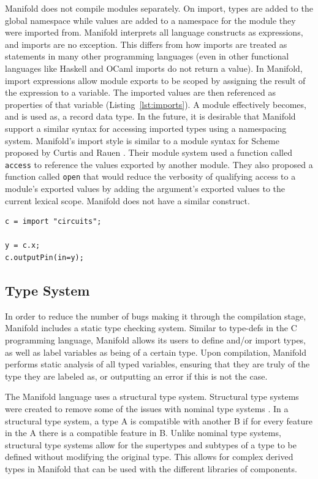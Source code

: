 Manifold does not compile modules separately. On import, types
are added to the global namespace while values are added to a namespace for the
module they were imported from. Manifold interprets all language constructs as
expressions, and imports are no exception. This differs from how imports are
treated as statements in many other
programming languages (even in other functional languages like Haskell and
OCaml imports do not return a value).  In Manifold, import expressions allow module
exports to be scoped by assigning the result of the expression
to a variable. The imported values are then referenced as properties of that
variable (Listing~\ref{lst:imports}). A module effectively becomes, and is used as,
a
record data type. In the future, it is desirable that Manifold support a
similar syntax for accessing imported types using a namespacing system.
Manifold's import style is similar to a module syntax for Scheme proposed by
Curtis and Rauen \cite{Curtis:1990:MSS:91556.91573}. Their module system used
a function called \texttt{access} to reference the values exported by another
module. They also proposed a function called \texttt{open} that would reduce
the verbosity of qualifying access to a module's exported values by adding the
argument's exported values to the current lexical scope. Manifold does not
have a similar construct.

\begin{lstlisting}[label=lst:imports, caption=A module imported into a Manifold file]
c = import "circuits";

y = c.x;
c.outputPin(in=y);
\end{lstlisting}

\subsection{Type System}

In order to reduce the number of bugs making it through the compilation stage,
Manifold includes a static type checking system. Similar to type-defs in the C
programming language, Manifold allows its users to define and/or import types,
as well as label variables as being of a certain type. Upon compilation,
Manifold performs static analysis of all typed variables, ensuring that they are
truly of the type they are labeled as, or outputting an error if this is not the
case.

The Manifold language uses a structural type system. Structural type systems were
created to remove some of the issues with nominal type systems
\cite{Gil:2008:WIS:1449764.1449771}. In a structural
type system, a type A is compatible with another B if for every feature in the
A there is a compatible feature in B. Unlike nominal type systems, structural
type systems allow for the supertypes and subtypes of a type to be defined without
modifying the original type. This allows for complex derived types in Manifold that
can be used with the different libraries of components.


